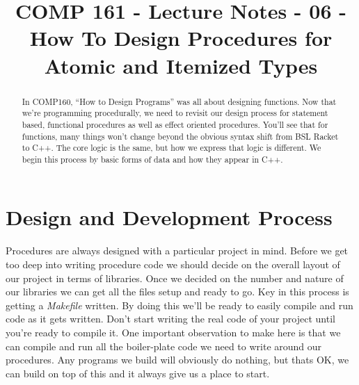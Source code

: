 \documentclass[]{tufte-handout}
\title{COMP 161 - Lecture Notes - 06 - How To Design Procedures for Atomic and Itemized Types}
\begin{document}
 
\maketitle

\begin{abstract}
In COMP160, ``How to Design Programs'' was all about designing functions.  Now that we're programming procedurally, we need to revisit our design process for statement based, functional procedures as well as effect oriented procedures. You'll see that for functions, many things won't change beyond the obvious syntax shift from BSL Racket to C++.  The core logic is the same, but how we express that logic is different. We begin this process by basic forms of data and how they appear in C++.
\end{abstract}

\section{Design and Development Process}

Procedures are always designed with a particular project in mind. Before we get too deep into writing procedure code we should decide on the overall layout of our project in terms of libraries.  Once we decided on the number and nature of our libraries we can get all the files setup and ready to go.  Key in this process is getting a \textit{Makefile} written. By doing this we'll be ready to easily compile and run code as it gets written. Don't start writing the real code of your project until you're ready to compile it.  One important observation to make here is that we can compile and run all the boiler-plate code we need to write around our procedures. Any programs we build will obviously do nothing, but thats OK, we can build on top of this and it always give us a place to start.
\end{document}
